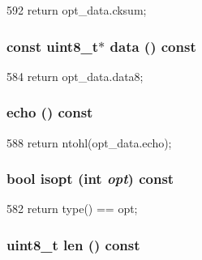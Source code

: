 \begin{DoxyCode}
592 { return opt_data.cksum; }
\end{DoxyCode}
\hypertarget{structNet_1_1TcpOpt_a40fe50b14bf164129156972247acb8e4}{
\subsubsection[{data}]{\setlength{\rightskip}{0pt plus 5cm}const uint8\_\-t$\ast$ data () const}}
\label{structNet_1_1TcpOpt_a40fe50b14bf164129156972247acb8e4}



\begin{DoxyCode}
584 { return opt_data.data8; }
\end{DoxyCode}
\hypertarget{structNet_1_1TcpOpt_af0842b965063493bddbb1e8348321da5}{
\subsubsection[{echo}]{ echo () const}}
\label{structNet_1_1TcpOpt_af0842b965063493bddbb1e8348321da5}



\begin{DoxyCode}
588 { return ntohl(opt_data.echo); }
\end{DoxyCode}
\hypertarget{structNet_1_1TcpOpt_abb7301dd1b816fcfb0f9922c1cd7675c}{
\subsubsection[{isopt}]{\setlength{\rightskip}{0pt plus 5cm}bool isopt (int {\em opt}) const}}
\label{structNet_1_1TcpOpt_abb7301dd1b816fcfb0f9922c1cd7675c}



\begin{DoxyCode}
582 { return type() == opt; }
\end{DoxyCode}
\hypertarget{structNet_1_1TcpOpt_a157a538f6c0e591c974744259b42d8f3}{
\subsubsection[{len}]{\setlength{\rightskip}{0pt plus 5cm}uint8\_\-t len () const}}
\label{structNet_1_1TcpOpt_a157a538f6c0e591c974744259b42d8f3}



